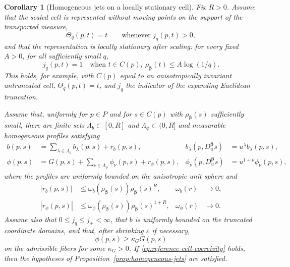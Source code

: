 \documentclass[11pt]{amsart}
\numberwithin{equation}{section}
\newtheorem{corollary}[theorem]{Corollary}
\theoremstyle{definition}
\theoremstyle{remark}
\newcommand{\eps}{\varepsilon}
\begin{document}
\begin{corollary}[Homogeneous jets on a locally stationary cell]
\label{cor:homogeneous-stable-cell}
Fix $R>0$.  Assume that the scaled cell is represented without moving points on the support
of the transported measure,
\begin{equation}\label{eq:stationary-cell-support}
 \Theta_q(p,t)=t\qquad\text{whenever }j_q(p,t)>0,
\end{equation}
and that the representation is locally stationary after scaling: for every
fixed $A>0$, for all sufficiently small $q$,
\begin{equation}\label{eq:locally-stationary-cell}
 j_q(p,t)=1
 \quad\text{when }t\in C(p),\ 
 \rho_{\bm\beta}(t)\le A\log(1/q).
\end{equation}
This holds, for example, with $C(p)$ equal to an anisotropically invariant
untruncated cell, $\Theta_q(p,t)=t$, and $j_q$ the indicator of the expanding
Euclidean truncation.

Assume that, uniformly for $p\in P$ and for $s\in C(p)$ with
$\rho_{\bm\beta}(s)$ sufficiently small, there are finite sets
$\Lambda_b\subset[0,R]$ and $\Lambda_\phi\subset(0,R]$ and measurable
homogeneous profiles satisfying
\begin{align}
 b(p,s)&=\sum_{\lambda\in\Lambda_b}b_\lambda(p,s)+r_b(p,s),
 &b_\lambda(p,D_u^{\bm\beta}s)&=u^\lambda b_\lambda(p,s),
 \label{eq:b-jet}\\
 \phi(p,s)&=G(p,s)+\sum_{\nu\in\Lambda_\phi}\phi_\nu(p,s)+r_\phi(p,s),
 &\phi_\nu(p,D_u^{\bm\beta}s)&=u^{1+\nu}\phi_\nu(p,s),
 \label{eq:phi-jet}
\end{align}
where the profiles are uniformly bounded on the anisotropic unit sphere and
\begin{align}
 |r_b(p,s)|&\le\omega_b(\rho_{\bm\beta}(s))
 \rho_{\bm\beta}(s)^R,
 &\omega_b(r)&\to0,\label{eq:b-jet-rem}\\
 |r_\phi(p,s)|&\le\omega_\phi(\rho_{\bm\beta}(s))
 \rho_{\bm\beta}(s)^{1+R},
 &\omega_\phi(r)&\to0.\label{eq:phi-jet-rem}
\end{align}
Assume also that $0\le j_q\le j_+<\infty$, that $b$ is uniformly bounded on the
truncated coordinate domains, and that, after shrinking $\eps$ if necessary,
\begin{equation}\label{eq:phase-lower-bound}
 \phi(p,s)\ge\kappa_G G(p,s)
\end{equation}
on the admissible fibers for some $\kappa_G>0$.  If
\eqref{eq:reference-cell-coercivity} holds, then the hypotheses of
Proposition~\ref{prop:homogeneous-jets} are satisfied.
\end{corollary}
\end{document}

